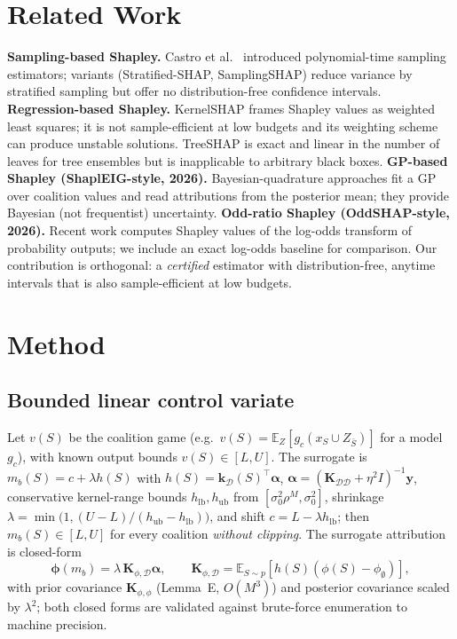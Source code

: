 \documentclass[11pt,twocolumn]{article}
\newcommand{\E}{\mathbb{E}}
\begin{document}
\section{Related Work}\label{sec:related}
\textbf{Sampling-based Shapley.}  Castro et al.\ \cite{castro2009} introduced
polynomial-time sampling estimators; variants (Stratified-SHAP,
SamplingSHAP) reduce variance by stratified sampling but offer no
distribution-free confidence intervals.
\textbf{Regression-based Shapley.}  KernelSHAP \cite{lundberg2017} frames
Shapley values as weighted least squares; it is not sample-efficient at low
budgets and its weighting scheme can produce unstable solutions.  TreeSHAP
\cite{lundberg2020} is exact and linear in the number of leaves for tree
ensembles but is inapplicable to arbitrary black boxes.
\textbf{GP-based Shapley (ShaplEIG-style, 2026).}  Bayesian-quadrature
approaches fit a GP over coalition values and read attributions from the
posterior mean; they provide Bayesian (not frequentist) uncertainty.
\textbf{Odd-ratio Shapley (OddSHAP-style, 2026).}  Recent work computes
Shapley values of the log-odds transform of probability outputs; we include
an exact log-odds baseline for comparison.  Our contribution is orthogonal:
a \emph{certified} estimator with distribution-free, anytime intervals that
is also sample-efficient at low budgets.

\section{Method}\label{sec:method}
\subsection{Bounded linear control variate}\label{sec:bcv}
Let $v(S)$ be the coalition game (e.g.\ $v(S)=\E_{Z}[g_c(x_S\cup
Z_{\bar S})]$ for a model $g_c$), with known output bounds
$v(S)\in[L,U]$.  The surrogate is $m_b(S)=c+\lambda h(S)$ with
$h(S)=\mathbf{k}_{\mathcal{D}}(S)^\top\boldsymbol{\alpha}$,
$\boldsymbol{\alpha}=(\mathbf{K}_{\mathcal{D}\mathcal{D}}+\eta^2
I)^{-1}\mathbf{y}$, conservative kernel-range bounds
$h_{\mathrm{lb}},h_{\mathrm{ub}}$ from
$[\sigma_0^2\rho^M,\sigma_0^2]$, shrinkage
$\lambda=\min\!\big(1,(U-L)/(h_{\mathrm{ub}}-h_{\mathrm{lb}})\big)$, and shift
$c=L-\lambda h_{\mathrm{lb}}$; then $m_b(S)\in[L,U]$ for every coalition
\emph{without clipping}.  The surrogate attribution is closed-form
\begin{equation}
\boldsymbol{\phi}(m_b)=\lambda\,\mathbf{K}_{\phi,\mathcal{D}}
\boldsymbol{\alpha},\qquad
\mathbf{K}_{\phi,\mathcal{D}}=\E_{S\sim p}[h(S)(\phi(S)-\phi_{\emptyset})],
\label{eq:lemD}
\end{equation}
with prior covariance $\mathbf{K}_{\phi,\phi}$ (Lemma~E, $O(M^3)$) and
posterior covariance scaled by $\lambda^2$; both closed forms are validated
against brute-force enumeration to machine precision.
\end{document}
